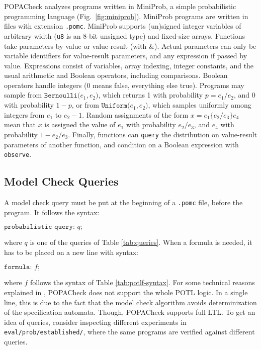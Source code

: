\documentclass[9pt,a4paper]{article}
\begin{document}
POPACheck analyzes programs written in MiniProb, a simple probabilistic programming language (Fig.~\ref{fig:miniprob}). MiniProb programs are written in files with extension \verb|.pomc|.
MiniProb supports (un)signed integer variables of arbitrary width
(\texttt{u8} is an 8-bit unsigned type) and fixed-size arrays.
Functions take parameters by value or value-result (with \&).
Actual parameters can only be variable identifiers for value-result parameters,
and any expression if passed by value.
Expressions consist of variables, array indexing, integer constants, and the usual arithmetic and Boolean operators, including comparisons.
Boolean operators handle integers (0 means false, everything else true).
Programs may sample from $\texttt{Bernoulli(} e_1, e_2 \texttt{)}$,
which returns 1 with probability $p = e_1 / e_2$, and 0 with probability $1-p$,
or from $\texttt{Uniform(} e_1, e_2 \texttt{)}$,
which samples uniformly among integers from $e_1$ to $e_2 - 1$.
Random assignments of the form $x = e_1 \{ e_2 / e_3 \} e_4$ mean that $x$ is assigned
the value of $e_1$ with probability $e_2 / e_3$, and $e_4$ with probability $1 - e_2 / e_3$.
Finally, functions can \texttt{query} the distribution on value-result parameters of another function, and condition on a Boolean expression with \texttt{observe}.

\subsection{Model Check Queries}
\label{sec:queries}
A model check query must be put at the beginning of a \verb|.pomc| file, before the program. It follows the syntax: 
\begin{center}
    $\texttt{probabilistic query:} \, \, q \texttt{;}$
\end{center}
where $q$ is one of the queries of Table \ref{tab:queries}. When a formula is needed, it has to be placed on a new line with syntax:
\begin{center}
    $\texttt{formula:} \, \, f \texttt{;}$
\end{center}
where $f$ follows the syntax of Table \ref{tab:potlf-syntax}. For some technical reasons explained in \cite{abs-2404-03515}, POPACheck does not support the whole POTL logic. In a single line, this is due to the fact that the model check algorithm avoids determinization of the specification automata. Though, POPACheck supports full LTL. To get an idea of queries, consider inspecting different experiments in \verb|eval/prob/established/|, where the same programs are verified against different queries.
\end{document}
